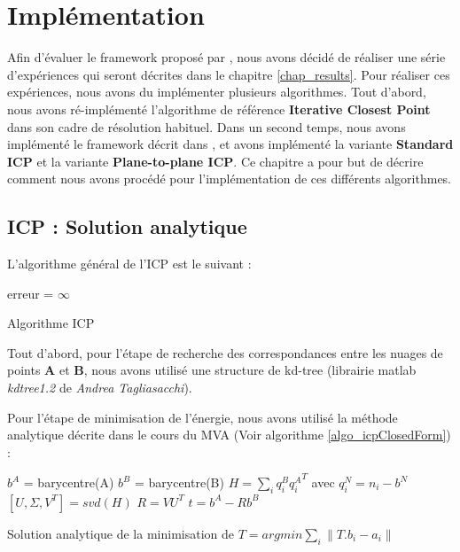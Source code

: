 \section{Implémentation}
Afin d'évaluer le framework proposé par \cite{bib_gicp}, nous avons décidé de réaliser une série d'expériences qui seront décrites dans le chapitre \ref{chap_results}. Pour réaliser ces expériences, nous avons du implémenter plusieurs algorithmes. Tout d'abord, nous avons ré-implémenté l'algorithme de référence \textbf{Iterative Closest Point} dans son cadre de résolution habituel.  Dans un second temps, nous avons implémenté le framework décrit dans \cite{bib_gicp}, et avons implémenté la variante \textbf{Standard ICP} et la variante \textbf{Plane-to-plane ICP}. Ce chapitre a pour but de décrire comment nous avons procédé pour l'implémentation de ces différents algorithmes.

\subsection{ICP : Solution analytique}

L'algorithme général de l'ICP est le suivant :\\

\begin{algorithm}[H]
erreur = $\infty$\;
\caption{Algorithme ICP}
\label{algo_icp}
\end{algorithm}

Tout d'abord, pour l'étape de recherche des correspondances entre les nuages de points $\mathbf{A}$ et $\mathbf{B}$, nous avons utilisé une structure de kd-tree (librairie matlab \textit{kdtree1.2} de \textit{Andrea Tagliasacchi}).

Pour l'étape de minimisation de l'énergie, nous avons utilisé la méthode analytique décrite dans le cours du MVA (Voir algorithme \ref{algo_icpClosedForm}) :\\

\begin{algorithm}[H]
$b^{A}$ = barycentre(A)\;
$b^{B}$ = barycentre(B)\;
$H = \sum_{i}q_{i}^{B}{q_{i}^{A}}^T$ avec $q_{i}^{N} = n_{i}-b^{N}$\;
$[U,\Sigma,V^{T}] = svd(H)$\;
$R = VU^{T}$\;
$t = b^{A}-Rb^{B}$\;
\caption{Solution analytique de la minimisation de $T = arg min \sum_{i}{\|T.b_{i}-a_{i}\|}$}
\label{algo_icpClosedForm}
\end{algorithm}


